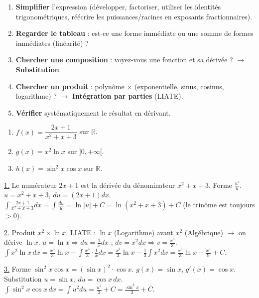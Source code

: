 \documentclass[11pt]{article}
\begin{document}
\begin{methode}
\begin{enumerate}
    \item \textbf{Simplifier} l'expression (développer, factoriser, utiliser les identités trigonométriques, réécrire les puissances/racines en exposants fractionnaires).
    \item \textbf{Regarder le tableau} : est-ce une forme immédiate ou une somme de formes immédiates (linéarité) ?
    \item \textbf{Chercher une composition} : voyez-vous une fonction et sa dérivée ? $\rightarrow$ \textbf{Substitution}.
    \item \textbf{Chercher un produit} : polynôme $\times$ (exponentielle, sinus, cosinus, logarithme) ? $\rightarrow$ \textbf{Intégration par parties} (LIATE).
    \item \textbf{Vérifier} systématiquement le résultat en dérivant.
\end{enumerate}
\end{methode}

\begin{exoresolu}
\begin{enumerate}
    \item $f(x) = \dfrac{2x+1}{x^2+x+3}$ sur $\mathbb{R}$.
    \item $g(x) = x^2 \ln x$ sur $]0, +\infty[$.
    \item $h(x) = \sin^2 x \cos x$ sur $\mathbb{R}$.
\end{enumerate}
\tcblower
\underline{1.} Le numérateur $2x+1$ est la dérivée du dénominateur $x^2+x+3$. Forme $\frac{u'}{u}$.
$u = x^2+x+3$, $du = (2x+1)dx$. $\int \frac{2x+1}{x^2+x+3} dx = \int \frac{du}{u} = \ln|u| + C = \ln(x^2+x+3) + C$ (le trinôme est toujours $>0$).

\underline{2.} Produit $x^2 \times \ln x$. LIATE : $\ln x$ (Logarithme) avant $x^2$ (Algébrique) $\rightarrow$ on dérive $\ln x$.
$u = \ln x \Rightarrow du = \frac{1}{x}dx$ ; $dv = x^2 dx \Rightarrow v = \frac{x^3}{3}$.
$\int x^2 \ln x \, dx = \frac{x^3}{3}\ln x - \int \frac{x^3}{3}\cdot\frac{1}{x}dx = \frac{x^3}{3}\ln x - \frac{1}{3}\int x^2 dx = \frac{x^3}{3}\ln x - \frac{x^3}{9} + C$.

\underline{3.} Forme $\sin^2 x \cos x = (\sin x)^2 \cdot \cos x$. $g(x)=\sin x$, $g'(x)=\cos x$. Substitution $u = \sin x$, $du = \cos x\,dx$.
$\int \sin^2 x \cos x \, dx = \int u^2 du = \frac{u^3}{3} + C = \frac{\sin^3 x}{3} + C$.
\end{exoresolu}
\end{document}
